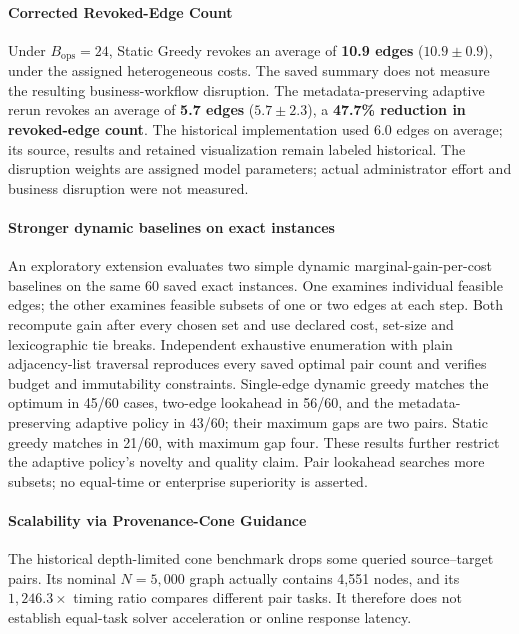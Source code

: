 \paragraph{Corrected Revoked-Edge Count}
Under $B_{\text{ops}} = 24$, Static Greedy revokes an average of \textbf{10.9 edges} ($10.9 \pm 0.9$), under the assigned heterogeneous costs. The saved summary does not measure the resulting business-workflow disruption. The metadata-preserving adaptive rerun revokes an average of \textbf{5.7 edges} ($5.7 \pm 2.3$), a \textbf{47.7\% reduction in revoked-edge count}. The historical implementation used 6.0 edges on average; its source, results and retained visualization remain labeled historical. The disruption weights are assigned model parameters; actual administrator effort and business disruption were not measured.



\paragraph{Stronger dynamic baselines on exact instances}
An exploratory extension evaluates two simple dynamic marginal-gain-per-cost baselines on the same 60 saved exact instances. One examines individual feasible edges; the other examines feasible subsets of one or two edges at each step. Both recompute gain after every chosen set and use declared cost, set-size and lexicographic tie breaks. Independent exhaustive enumeration with plain adjacency-list traversal reproduces every saved optimal pair count and verifies budget and immutability constraints. Single-edge dynamic greedy matches the optimum in 45/60 cases, two-edge lookahead in 56/60, and the metadata-preserving adaptive policy in 43/60; their maximum gaps are two pairs. Static greedy matches in 21/60, with maximum gap four. These results further restrict the adaptive policy's novelty and quality claim. Pair lookahead searches more subsets; no equal-time or enterprise superiority is asserted.

\paragraph{Scalability via Provenance-Cone Guidance}
The historical depth-limited cone benchmark drops some queried source--target pairs. Its nominal $N=5,000$ graph actually contains 4,551 nodes, and its $1,246.3\times$ timing ratio compares different pair tasks. It therefore does not establish equal-task solver acceleration or online response latency.

